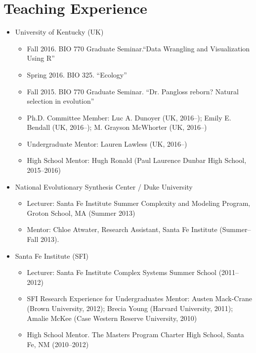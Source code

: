 \documentclass[11pt]{article}
\begin{document}
  \section{Teaching Experience}

  \begin{itemize}
  \item University of Kentucky (UK)
    \begin{itemize}
    \item Fall 2016. BIO 770 Graduate Seminar.``Data Wrangling and Visualization Using R''
    \item Spring 2016. BIO 325. ``Ecology''
    \item Fall 2015. BIO 770 Graduate Seminar. ``Dr. Pangloss reborn? Natural selection in evolution''
    \item Ph.D. Committee Member: Luc A. Dunoyer (UK, 2016--); Emily E. Bendall (UK, 2016--); M. Grayson McWhorter (UK, 2016--)
    \item Undergraduate Mentor: Lauren Lawless (UK, 2016--)
    \item High School Mentor: Hugh Ronald (Paul Laurence Dunbar High School, 2015--2016)
    \end{itemize}
  \item National Evolutionary Synthesis Center / Duke University
    \begin{itemize}
    \item Lecturer: Santa Fe Institute Summer Complexity and Modeling Program, \\
      Groton School, MA (Summer 2013)
    \item Mentor: Chloe Atwater, Research Assistant, Santa Fe Institute (Summer--Fall 2013).
    \end{itemize}
  \item Santa Fe Institute (SFI)
    \begin{itemize}
    \item Lecturer: Santa Fe Institute Complex Systems Summer School (2011--2012)
    \item SFI Research Experience for Undergraduates Mentor: Austen Mack-Crane (Brown University, 2012); Brecia Young (Harvard University, 2011); 
      Amalie McKee (Case Western Reserve University, 2010)
    \item High School Mentor. The Masters Program Charter High School, Santa Fe, NM (2010--2012)
    \end{itemize}

\end{itemize}
\end{document}
